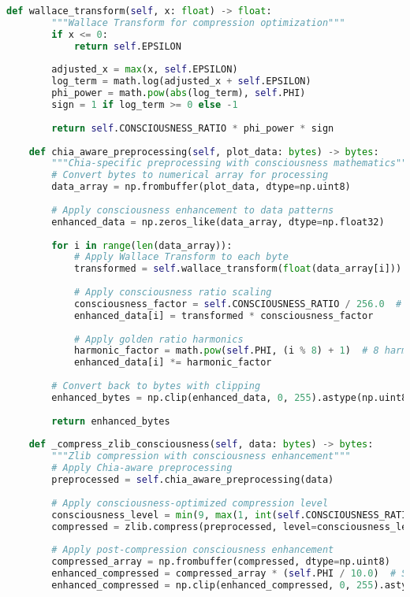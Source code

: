 \documentclass[11pt,a4paper]{article}
\begin{document}
\begin{lstlisting}[language=Python, caption=SquashPlot Complete Compression Implementation]
    def wallace_transform(self, x: float) -> float:
        """Wallace Transform for compression optimization"""
        if x <= 0:
            return self.EPSILON
            
        adjusted_x = max(x, self.EPSILON)
        log_term = math.log(adjusted_x + self.EPSILON)
        phi_power = math.pow(abs(log_term), self.PHI)
        sign = 1 if log_term >= 0 else -1
        
        return self.CONSCIOUSNESS_RATIO * phi_power * sign
    
    def chia_aware_preprocessing(self, plot_data: bytes) -> bytes:
        """Chia-specific preprocessing with consciousness mathematics"""
        # Convert bytes to numerical array for processing
        data_array = np.frombuffer(plot_data, dtype=np.uint8)
        
        # Apply consciousness enhancement to data patterns
        enhanced_data = np.zeros_like(data_array, dtype=np.float32)
        
        for i in range(len(data_array)):
            # Apply Wallace Transform to each byte
            transformed = self.wallace_transform(float(data_array[i]))
            
            # Apply consciousness ratio scaling
            consciousness_factor = self.CONSCIOUSNESS_RATIO / 256.0  # Normalize to byte range
            enhanced_data[i] = transformed * consciousness_factor
            
            # Apply golden ratio harmonics
            harmonic_factor = math.pow(self.PHI, (i % 8) + 1)  # 8 harmonics for byte
            enhanced_data[i] *= harmonic_factor
        
        # Convert back to bytes with clipping
        enhanced_bytes = np.clip(enhanced_data, 0, 255).astype(np.uint8).tobytes()
        
        return enhanced_bytes
    
    def _compress_zlib_consciousness(self, data: bytes) -> bytes:
        """Zlib compression with consciousness enhancement"""
        # Apply Chia-aware preprocessing
        preprocessed = self.chia_aware_preprocessing(data)
        
        # Apply consciousness-optimized compression level
        consciousness_level = min(9, max(1, int(self.CONSCIOUSNESS_RATIO / 21.0)))
        compressed = zlib.compress(preprocessed, level=consciousness_level)
        
        # Apply post-compression consciousness enhancement
        compressed_array = np.frombuffer(compressed, dtype=np.uint8)
        enhanced_compressed = compressed_array * (self.PHI / 10.0)  # Subtle enhancement
        enhanced_compressed = np.clip(enhanced_compressed, 0, 255).astype(np.uint8)
        

\end{lstlisting}
\end{document}
